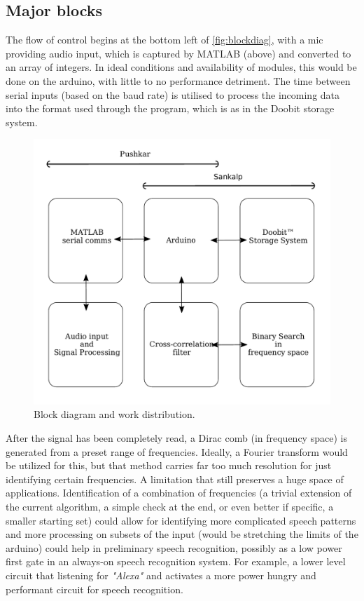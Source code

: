 \subsection{Major blocks}

The flow of control begins at the bottom left of \autoref{fig:blockdiag}, with a
mic providing audio input, which is captured by MATLAB (above) and converted to
an array of integers. In ideal conditions and availability of modules, this
would be done on the arduino, with little to no performance detriment. The time
between serial inputs (based on the baud rate) is utilised to process the
incoming data into the format used through the program, which is as in the
Doobit storage system. 

\begin{figure}[ht]
    \centering
    \includegraphics[height=0.4\textheight]{fig/blockdiag.pdf}
    \caption{Block diagram and work distribution.}
    \label{fig:blockdiag}
\end{figure}

After the signal has been completely read, a Dirac comb (in frequency space) is
generated from a preset range of frequencies. Ideally, a Fourier transform would
be utilized for this, but that method carries far too much resolution for just
identifying certain frequencies. A limitation that still preserves a huge space
of applications. Identification of a combination of frequencies (a trivial
extension of the current algorithm, a simple check at the end, or even better if
specific, a smaller starting set) could allow for identifying more complicated
speech patterns and more processing on subsets of the input (would be stretching
the limits of the arduino) could help in preliminary speech recognition,
possibly as a low power first gate in an always-on speech recognition system.
For example, a lower level circuit that listening for \emph{"Alexa"} and
activates a more power hungry and performant circuit for speech recognition.


